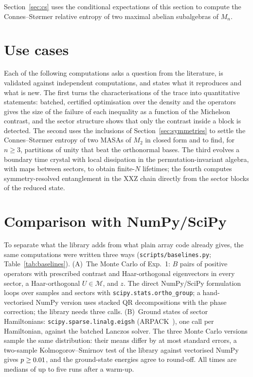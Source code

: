\documentclass[11pt]{article}
\newcommand{\M}{\mathcal{M}}
\providecommand{\BaseMinKS}{--}\providecommand{\BoundsStChecked}{--}\providecommand{\BoundsStOutside}{--}\providecommand{\BoundsShortfall}{--}
\begin{document}
\noindent Section~\ref{sec:cs} uses the conditional expectations of this section to compute the Connes--St{\o}rmer
relative entropy of two maximal abelian subalgebras of $M_n$.

\section{Use cases}\label{sec:usecases}

Each of the following computations asks a question from the literature, is validated against independent
computations, and states what it reproduces and what is new. The first turns the characterisations of the trace into
quantitative statements: batched, certified optimisation over the density and the operators gives the size of the
failure of each inequality as a function of the Michelson contrast, and the sector structure shows that only the
contrast inside a block is detected. The second uses the inclusions of Section~\ref{sec:symmetries} to settle the
Connes--St{\o}rmer entropy of two MASAs of $M_2$ in closed form and to find, for $n\ge3$, partitions of unity that beat
the orthonormal bases. The third evolves a boundary time crystal with local dissipation in the permutation-invariant
algebra, with maps between sectors, to obtain finite-$N$ lifetimes; the fourth computes symmetry-resolved entanglement
in the XXZ chain directly from the sector blocks of the reduced state.









\section{Comparison with NumPy/SciPy}\label{sec:baselines}

To separate what the library adds from what plain array code already gives, the same computations were written
three ways (\texttt{scripts/baselines.py}; Table~\ref{tab:baselines}). (A)~The Monte Carlo of Exp.~1: $B$ pairs of
positive operators with prescribed contrast and Haar-orthogonal eigenvectors in every sector, a Haar-orthogonal $U\in\M$,
and $z$. The direct NumPy/SciPy formulation loops over samples and sectors with \texttt{scipy.stats.ortho\_group};
a hand-vectorised NumPy version uses stacked QR decompositions with the phase correction; the library needs three
calls. (B)~Ground states of sector Hamiltonians: \texttt{scipy.sparse.linalg.eigsh} (ARPACK~\cite{lehoucq1998}), one
call per Hamiltonian, against the batched Lanczos solver. The three Monte Carlo versions sample the same distribution:
their means differ by at most  standard errors, a two-sample
Kolmogorov--Smirnov test of the library against vectorised NumPy gives $p\ge\IfFileExists{generated/baselines.tex}{\BaseMinKS}{0.01}$,
and the ground-state energies agree to round-off. All times are medians of up to five runs after a warm-up.
\end{document}
